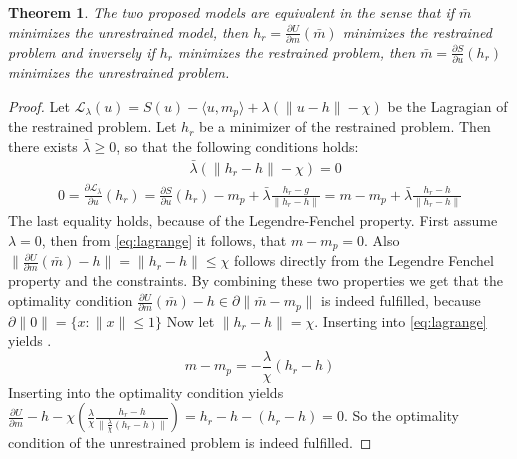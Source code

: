 \documentclass[a4paper,10pt]{article}
\newtheorem{theorem}{Theorem}[section]
\begin{document}
\begin{theorem}
The two proposed models are equivalent in the sense that if $\bar m$ minimizes the unrestrained model, then $h_r = \frac{\partial U}{\partial m}(\bar m)$ minimizes the restrained problem and inversely if $h_r$ minimizes the restrained problem, then $\bar m = \frac{\partial S}{\partial u}(h_r)$ minimizes the unrestrained problem.
\end{theorem}

\begin{proof}
Let $\mathcal L_\lambda(u) = S(u) - \langle u,m_p \rangle + \lambda(\|u - h\| - \chi)$ be the Lagragian of the restrained problem. 
Let $h_r$ be a minimizer of the restrained problem. Then there exists $\bar \lambda \geq 0$, so that the following conditions holds:
\begin{align}\label{eq:restictions}
    &\bar \lambda (\|h_r - h\| - \chi) = 0
\end{align}
\begin{align}\label{eq:lagrange}
    0 = \frac{\partial \mathcal L_{\bar \lambda}}{\partial u}(h_r) = \frac{\partial S}{\partial u}(h_r) - m_p + \bar \lambda \frac{h_r - g}{\|h_r - h\|} = m - m_p +\bar \lambda\frac{h_r -  h}{\|h_r - h\|}
\end{align}
The last equality holds, because of the Legendre-Fenchel property. 
First assume $\lambda = 0$, then from \eqref{eq:lagrange} it follows, that $m-m_p = 0$. Also $\|\frac{\partial U}{\partial m}(\bar m) - h\| =\|h_r - h\| \leq \chi$ follows directly from the Legendre Fenchel property and the constraints. By combining these two properties we get that the optimality condition $\frac{\partial U}{\partial m}(\bar m) - h \in \partial \|\bar m - m_p\|$ is indeed fulfilled, because $\partial \|0\| = \{x \colon \|x\| \leq 1\}$
Now let $\|h_r - h\| = \chi$. Inserting into \eqref{eq:lagrange} yields .$$m - m_p = - \frac{\lambda}{\chi}(h_r - h)$$
Inserting into the optimality condition yields $\frac{\partial U}{\partial m} - h - \chi (\frac{\lambda}{\chi} \frac{h_r - h}{\|\frac{\lambda}{\chi} (h_r - h) \|}) = h_r  - h - (h_r - h) = 0$. So the optimality condition of the unrestrained problem is indeed fulfilled.


\end{proof}
\end{document}
